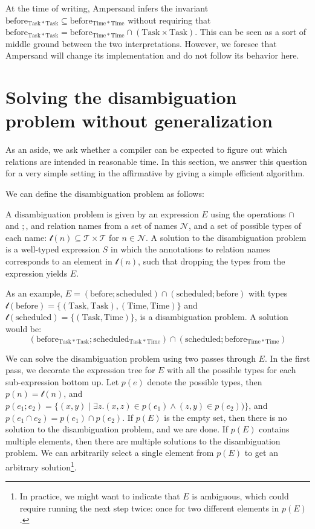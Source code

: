 \documentclass[12pt]{article}
\begin{document}
At the time of writing, Ampersand infers the invariant $\mathrm{before}_{\mathrm{Task * Task}} \subseteq \mathrm{before}_{\mathrm{Time * Time}}$ without requiring that $\mathrm{before}_{\mathrm{Task * Task}} = \mathrm{before}_{\mathrm{Time * Time}} \cap (\mathrm{Task}\times\mathrm{Task})$. This can be seen as a sort of middle ground between the two interpretations. However, we foresee that Ampersand will change its implementation and do not follow its behavior here.

\section{Solving the disambiguation problem without generalization}
As an aside, we ask whether a compiler can be expected to figure out which relations are intended in reasonable time. In this section, we answer this question for a very simple setting in the affirmative by giving a simple efficient algorithm.

We can define the disambiguation problem as follows:

A disambiguation problem is given by an expression $E$ using the operations $\cap$ and $;$, and relation names from a set of names $\mathcal{N}$, and a set of possible types of each name: $\mathcal{t}(n) \subseteq \mathcal{T}\times \mathcal{T}$ for $n\in \mathcal{N}$.
A solution to the disambiguation problem is a well-typed expression $S$ in which the annotations to relation names corresponds to an element in $\mathcal{t}(n)$, such that dropping the types from the expression yields $E$.

As an example, $E = (\mathrm{before};\mathrm{scheduled}) \cap (\mathrm{scheduled};\mathrm{before})$ with types $\mathcal{t}(\mathrm{before}) = \{(\mathrm{Task}, \mathrm{Task}),(\mathrm{Time}, \mathrm{Time})\}$ and $\mathcal{t}(\mathrm{scheduled}) = \{(\mathrm{Task}, \mathrm{Time})\}$, is a disambiguation problem.
A solution would be:
\[\left(\mathrm{before}_{\mathrm{Task * Task}};\mathrm{scheduled}_{\mathrm{Task * Time}}\right) \cap \left(\mathrm{scheduled};\mathrm{before}_{\mathrm{Time * Time}}\right)\]

We can solve the disambiguation problem using two passes through $E$.
In the first pass, we decorate the expression tree for $E$ with all the possible types for each sub-expression bottom up.
Let $p(e)$ denote the possible types, then $p(n) = \mathcal{t}(n)$, and $p(e_1;e_2) = \{(x,y) \mid \exists z. (x,z) \in p(e_1) \wedge (z,y) \in p(e_2))\}$, and $p(e_1 \cap e_2) = p(e_1) \cap p(e_2)$.
If $p(E)$ is the empty set, then there is no solution to the disambiguation problem, and we are done.
If $p(E)$ contains multiple elements, then there are multiple solutions to the disambiguation problem.
We can arbitrarily select a single element from $p(E)$ to get an arbitrary solution\footnote{In practice, we might want to indicate that $E$ is ambiguous, which could require running the next step twice: once for two different elements in $p(E)$.}.
\end{document}
